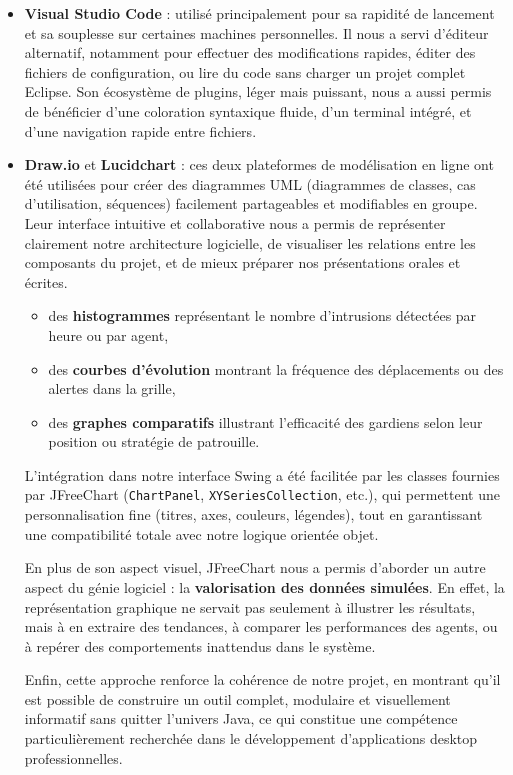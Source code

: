 \begin{itemize}
    \item \textbf{Visual Studio Code} : utilisé principalement pour sa rapidité de lancement et sa souplesse sur certaines machines personnelles. Il nous a servi d’éditeur alternatif, notamment pour effectuer des modifications rapides, éditer des fichiers de configuration, ou lire du code sans charger un projet complet Eclipse. Son écosystème de plugins, léger mais puissant, nous a aussi permis de bénéficier d’une coloration syntaxique fluide, d’un terminal intégré, et d’une navigation rapide entre fichiers.

    \item \textbf{Draw.io} et \textbf{Lucidchart} : ces deux plateformes de modélisation en ligne ont été utilisées pour créer des diagrammes UML (diagrammes de classes, cas d’utilisation, séquences) facilement partageables et modifiables en groupe. Leur interface intuitive et collaborative nous a permis de représenter clairement notre architecture logicielle, de visualiser les relations entre les composants du projet, et de mieux préparer nos présentations orales et écrites.

\begin{itemize}
    \item des \textbf{histogrammes} représentant le nombre d’intrusions détectées par heure ou par agent,
    \item des \textbf{courbes d’évolution} montrant la fréquence des déplacements ou des alertes dans la grille,
    \item des \textbf{graphes comparatifs} illustrant l’efficacité des gardiens selon leur position ou stratégie de patrouille.
\end{itemize}

L’intégration dans notre interface Swing a été facilitée par les classes fournies par JFreeChart (\texttt{ChartPanel}, \texttt{XYSeriesCollection}, etc.), qui permettent une personnalisation fine (titres, axes, couleurs, légendes), tout en garantissant une compatibilité totale avec notre logique orientée objet.

En plus de son aspect visuel, JFreeChart nous a permis d’aborder un autre aspect du génie logiciel : la \textbf{valorisation des données simulées}. En effet, la représentation graphique ne servait pas seulement à illustrer les résultats, mais à en extraire des tendances, à comparer les performances des agents, ou à repérer des comportements inattendus dans le système.

Enfin, cette approche renforce la cohérence de notre projet, en montrant qu’il est possible de construire un outil complet, modulaire et visuellement informatif sans quitter l’univers Java, ce qui constitue une compétence particulièrement recherchée dans le développement d’applications desktop professionnelles.


\end{itemize}

